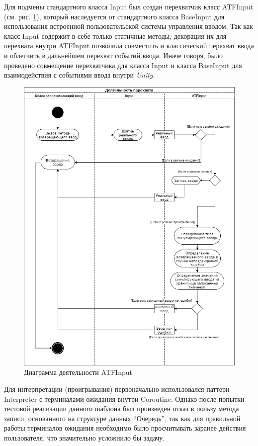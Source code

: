 Для подмены стандартного класса Input был создан перехватчик класс ATFInput (см. рис. \ref{atfInput}), который наследуется от стандартного класса BaseInput для использования встроенной пользовательской системы управления вводом. Так как класс Input содержит в себе только статичные методы, декорация их для перехвата внутри ATFInput позволила совместить и классический перехват ввода и облегчить в дальнейшем перехват событий ввода. Иначе говоря, было проведено совмещение перехватчика для класса Input и класса BaseInput для взаимодействия с событиями ввода внутри \textit{Unity}. 

\begin{figure}[H]
	\centering
	\includegraphics[width=0.8\linewidth]{atfInput.png}
	\caption{Диаграмма деятельности ATFInput}
	\label{atfInput}
\end{figure}


Для интерпретации (проигрывания) первоначально использовался паттерн Interpreter с терминалами ожидания внутри Coroutine. Однако после попытки тестовой реализации данного шаблона был произведен отказ в пользу метода записи, основанного на структуре данных ``Очередь'', так как для правильной работы терминалов ожидания необходимо было просчитывать заранее действия пользователя, что значительно усложнило бы задачу.